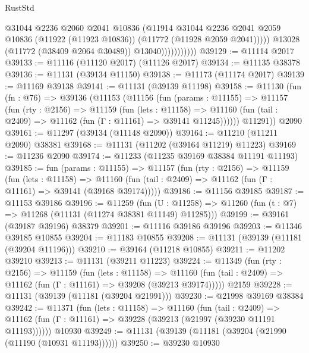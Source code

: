 \begin{lexlean}{RustStd}
\begin{coremodule}
                              @31044
                              @2236
                              @2060
                              @2041
                              @10836
                              (@11914
                                @31044
                                @2236
                                @2041
                                @2059
                                @10836
                                (@11922 (@11923 @10836))
                                (@11772 (@11928 @2059 @2041)))))
                          @13028
                          (@11772 (@38409 @2064 @30489))
                          @13040)))))))))))
@39129 := @11114 @2017
@39133 := @11116 (@11120 @2017) (@11126 @2017)
@39134 := @11135 @38378
@39136 := @11131 (@39134 @11150)
@39138 := @11173 (@11174 @2017)
@39139 := @11169 @39138
@39141 := @11131 (@39139 @11198)
@39158 := @11130
    (fun (fn : @76) =>
    @39136
      (@11153
        (@11156
          (fun (params : @11155) =>
          @11157
            (fun (rty : @2156) =>
            @11159
              (fun (lets : @11158) =>
              @11160 (fun (tail : @2409) => @11162 (fun (Γ : @11161) => @39141 @11245))))))
        @11291))
    @2090
@39161 := @11297 (@39134 (@11148 @2090))
@39164 := @11210 (@11211 @2090) @38381
@39168 := @11131 (@11202 (@39164 @11219) @11223)
@39169 := @11236 @2090
@39174 := @11233 (@11235 @39169 @38384 @11191 @11193)
@39185 := fun (params : @11155) =>
  @11157
    (fun (rty : @2156) =>
    @11159
      (fun (lets : @11158) =>
      @11160 (fun (tail : @2409) => @11162 (fun (Γ : @11161) => @39141 (@39168 @39174)))))
@39186 := @11156 @39185
@39187 := @11153 @39186
@39196 := @11259
    (fun (U : @11258) => @11260 (fun (t : @7) => @11268 (@11131 (@11274 @38381 @11149) @11285)))
@39199 := @39161 (@39187 @39196) @38379
@39201 := @11116 @39186 @39196
@39203 := @11346 @39185 @10855
@39204 := @11183 @10855
@39208 := @11131 (@39139 (@11181 (@39204 @11196)))
@39210 := @39164 (@11218 @10855)
@39211 := @11202 @39210
@39213 := @11131 (@39211 @11223)
@39224 := @11349
    (fun (rty : @2156) =>
    @11159
      (fun (lets : @11158) =>
      @11160 (fun (tail : @2409) => @11162 (fun (Γ : @11161) => @39208 (@39213 @39174)))))
    @2159
@39228 := @11131 (@39139 (@11181 (@39204 @21991)))
@39230 := @21998 @39169 @38384
@39242 := @11371
    (fun (lets : @11158) =>
    @11160
      (fun (tail : @2409) =>
      @11162 (fun (Γ : @11161) => @39228 (@39213 (@21997 (@39230 @11191 @11193))))))
    @10930
@39249 := @11131 (@39139 (@11181 (@39204 (@21990 (@11190 (@10931 @11193))))))
@39250 := @39230 @10930

\end{coremodule}
\end{lexlean}
